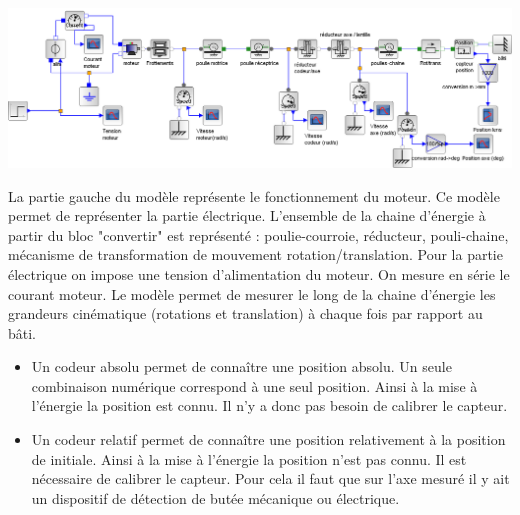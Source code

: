 {
\begin{center}
\includegraphics[width=1.0\textwidth]{images/image13.png}
\end{center}
}



\begin{texteCache}
La partie gauche du modèle représente le fonctionnement du moteur. Ce modèle permet de représenter la partie électrique. L'ensemble de la chaine d'énergie à partir du bloc "convertir" est représenté : poulie-courroie, réducteur, pouli-chaine, mécanisme de transformation de mouvement rotation/translation. Pour la partie électrique on impose une tension d'alimentation du moteur. On mesure en série le courant moteur. Le modèle permet de mesurer le long de la chaine d'énergie les grandeurs cinématique (rotations et translation) à chaque fois par rapport au bâti.
\end{texteCache}


\begin{texteCache}
\begin{itemize}
\item Un codeur absolu permet de connaître une position absolu. Un seule combinaison numérique correspond à une seul position. Ainsi à la mise à l'énergie la position est connu. Il n'y a donc pas besoin de calibrer le capteur.
\item Un codeur relatif permet de connaître une position relativement à la position de initiale. Ainsi à la mise à l'énergie la position n'est pas connu. Il est nécessaire de calibrer le capteur. Pour cela il faut que sur l'axe mesuré il y ait un dispositif de détection de butée mécanique ou électrique.
\end{itemize}
\end{texteCache}


